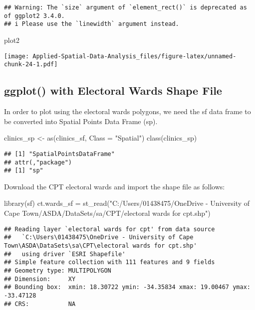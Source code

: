 \documentclass[
]{book}
\newenvironment{Shaded}{\begin{snugshade}}{\end{snugshade}}
\newcommand{\AttributeTok}[1]{\textcolor[rgb]{0.77,0.63,0.00}{#1}}
\newcommand{\FunctionTok}[1]{\textcolor[rgb]{0.00,0.00,0.00}{#1}}
\newcommand{\NormalTok}[1]{#1}
\newcommand{\OtherTok}[1]{\textcolor[rgb]{0.56,0.35,0.01}{#1}}
\newcommand{\StringTok}[1]{\textcolor[rgb]{0.31,0.60,0.02}{#1}}
\begin{document}
\begin{verbatim}
## Warning: The `size` argument of `element_rect()` is deprecated as of ggplot2 3.4.0.
## i Please use the `linewidth` argument instead.
\end{verbatim}

\begin{Shaded}
\begin{Highlighting}[]
\NormalTok{plot2}
\end{Highlighting}
\end{Shaded}

\texttt{[image: Applied-Spatial-Data-Analysis\_files/figure-latex/unnamed-chunk-24-1.pdf]}

\hypertarget{ggplot-with-electoral-wards-shape-file}{%
\subsection{ggplot() with Electoral Wards Shape File}\label{ggplot-with-electoral-wards-shape-file}}

In order to plot using the electoral wards polygons, we need the sf data frame to be converted into Spatial Points Data Frame (sp).

\begin{Shaded}
\begin{Highlighting}[]
\NormalTok{clinics\_sp }\OtherTok{\textless{}{-}} \FunctionTok{as}\NormalTok{(clinics\_sf, }\AttributeTok{Class =} \StringTok{"Spatial"}\NormalTok{)}
\FunctionTok{class}\NormalTok{(clinics\_sp)}
\end{Highlighting}
\end{Shaded}

\begin{verbatim}
## [1] "SpatialPointsDataFrame"
## attr(,"package")
## [1] "sp"
\end{verbatim}

Download the CPT electoral wards and import the shape file as follows:

\begin{Shaded}
\begin{Highlighting}[]
\FunctionTok{library}\NormalTok{(sf)}
\NormalTok{ct.wards\_sf }\OtherTok{=} \FunctionTok{st\_read}\NormalTok{(}\StringTok{"C:/Users/01438475/OneDrive {-} University of Cape Town/ASDA/DataSets/sa/CPT/electoral wards for cpt.shp"}\NormalTok{)}
\end{Highlighting}
\end{Shaded}

\begin{verbatim}
## Reading layer `electoral wards for cpt' from data source 
##   `C:\Users\01438475\OneDrive - University of Cape Town\ASDA\DataSets\sa\CPT\electoral wards for cpt.shp' 
##   using driver `ESRI Shapefile'
## Simple feature collection with 111 features and 9 fields
## Geometry type: MULTIPOLYGON
## Dimension:     XY
## Bounding box:  xmin: 18.30722 ymin: -34.35834 xmax: 19.00467 ymax: -33.47128
## CRS:           NA
\end{verbatim}
\end{document}
